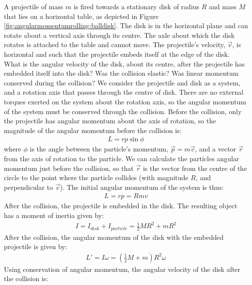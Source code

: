 \begin{example}{
A projectile of mass $m$ is fired towards a stationary disk of radius $R$ and mass $M$ that lies on a horizontal table, as depicted in Figure \ref{fig:angularmomentumrolling:balldisk}. The disk is in the horizontal plane and can rotate about a vertical axis through its centre. The axle about which the disk rotates is attached to the table and cannot move. The projectile's velocity, $\vec v$, is horizontal and such that the projectile embeds itself at the edge of the disk.  What is the angular velocity of the disk, about its centre, after the projectile has embedded itself into the disk? Was the collision elastic? Was linear momentum conserved during the collision?}
We consider the projectile and disk as a system, and a rotation axis that passes through the centre of disk. There are no external torques exerted on the system about the rotation axis, so the angular momentum of the system must be conserved through the collision. Before the collision, only the projectile has angular momentum about the axis of rotation, so the magnitude of the angular momentum before the collision is:
\begin{align*}
L = rp\sin\phi
\end{align*}
where $\phi$ is the angle between the particle's momentum, $\vec p=m\vec v$, and a vector $\vec r$ from the axis of rotation to the particle. We can calculate the particles angular momentum just before the collision, so that $\vec r$ is the vector from the centre of the circle to the point where the particle collides (with magnitude $R$, and perpendicular to $\vec v$). The initial angular momentum of the system is thus:
\begin{align*}
L=rp=Rmv
\end{align*}
After the collision, the projectile is embedded in the disk. The resulting object has a moment of inertia given by:
\begin{align*}
I = I_{disk}+ I_{particle} = \frac{1}{2}MR^2+mR^2
\end{align*} 
After the collision, the angular momentum of the disk with the embedded projectile is given by:
\begin{align*}
L'=I\omega = \left(\frac{1}{2}M+m\right)R^2\omega
\end{align*}
Using conservation of angular momentum, the angular velocity of the disk after the collision is:

\end{example}

